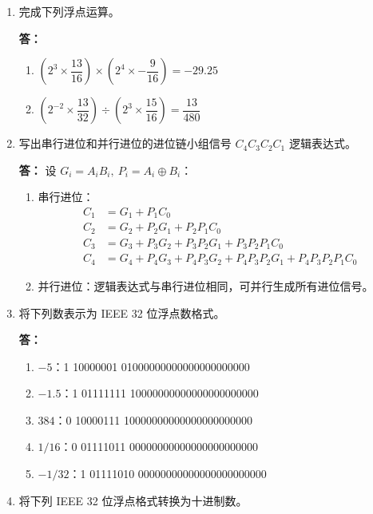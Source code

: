 \documentclass{article}
\begin{document}
\begin{enumerate}[label=\arabic*.]
    \item 完成下列浮点运算。
    
    \textbf{答：}
    \begin{enumerate}[label=(\arabic*)]
        \item $\left(2^3\times \dfrac{13}{16}\right) \times \left(2^4\times -\dfrac{9}{16}\right) = -29.25$
        \item $\left(2^{-2}\times \dfrac{13}{32}\right) \div \left(2^3\times \dfrac{15}{16}\right) = \dfrac{13}{480}$
    \end{enumerate}

    \item 写出串行进位和并行进位的进位链小组信号 $C_4C_3C_2C_1$ 逻辑表达式。
    
    \textbf{答：}
    设 $G_i=A_iB_i,\ P_i=A_i\oplus B_i$：
    \begin{enumerate}[label=(\arabic*)]
        \item 串行进位：
        \[
        \begin{aligned}
        C_1&=G_1+P_1C_0 \\
        C_2&=G_2+P_2G_1+P_2P_1C_0 \\
        C_3&=G_3+P_3G_2+P_3P_2G_1+P_3P_2P_1C_0 \\
        C_4&=G_4+P_4G_3+P_4P_3G_2+P_4P_3P_2G_1+P_4P_3P_2P_1C_0
        \end{aligned}
        \]
        \item 并行进位：逻辑表达式与串行进位相同，可并行生成所有进位信号。
    \end{enumerate}

    \item 将下列数表示为 IEEE 32 位浮点数格式。
    
    \textbf{答：}
    \begin{enumerate}[label=(\arabic*)]
        \item $-5$：1 10000001 01000000000000000000000
        \item $-1.5$：1 01111111 10000000000000000000000
        \item $384$：0 10000111 10000000000000000000000
        \item $1/16$：0 01111011 00000000000000000000000
        \item $-1/32$：1 01111010 00000000000000000000000
    \end{enumerate}

    \item 将下列 IEEE 32 位浮点格式转换为十进制数。
    

\end{enumerate}
\end{document}
